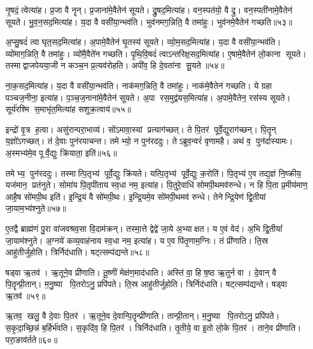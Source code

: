 नृ॒षदं॒ त्वेत्या॑ह।
प्र॒जा वै नॄन्।
प्र॒जाना॑मे॒वैतेन॑ सूयते।
द्रु॒षद॒मित्या॑ह।
वन॒स्पत॑यो॒ वै द्रु।
वन॒स्पती॑नामे॒वैतेन॑ सूयते।
भु॒व॒न॒सद॒मित्या॑ह।
य॒दा वै वसी॑या॒न्भव॑ति।
भुव॑नमग॒न्निति॒ वै तमा॑हुः।
भुव॑नमे॒वैतेन॑ गच्छति॥५३॥

अ॒प्सु॒षदं॑ त्वा घृत॒सद॒मित्या॑ह।
अ॒पामे॒वैतेन॑ घृ॒तस्य॑ सूयते।
व्यो॒म॒सद॒मित्या॑ह।
य॒दा वै वसी॑या॒न्भव॑ति।
व्यो॑माग॒न्निति॒ वै तमा॑हुः।
व्यो॑मै॒वैते॑न गच्छति।
पृ॒थि॒वि॒षदं॑ त्वाऽन्तरिक्ष॒सद॒मित्या॑ह।
ए॒षामे॒वैतेन॑ लो॒काना सूयते।
तस्माद्वाजपेयया॒जी न कञ्च॒न प्र॒त्यव॑रोहति।
अपी॑व॒ हि दे॒वता॑ना सू॒यते॥५४॥

ना॒क॒सद॒मित्या॑ह।
य॒दा वै वसी॑या॒न्भव॑ति।
नाक॑मग॒न्निति॒ वै तमा॑हुः।
नाक॑मे॒वैतेन॑ गच्छति।
ये ग्रहा पञ्चज॒नीना॒ इत्या॑ह।
प॒ञ्च॒ज॒नाना॑मे॒वैतेन॑ सूयते।
अ॒पा रस॒मुद्व॑यस॒मित्या॑ह।
अ॒पामे॒वैतेन॒ रस॑स्य सूयते।
सूर्य॑रश्मि स॒माभृ॑त॒मित्या॑ह सशुक्र॒त्वाय॑॥५५॥\anuvakamend[ग॒च्छ॒ति॒ सू॒यते॒ नव॑ च]

इन्द्रो॑ वृ॒त्र ह॒त्वा।
असु॑रान्परा॒भाव्य॑।
सो॑ऽमावा॒स्यां प्रत्याग॑च्छत्।
ते पि॒तर॑ पूर्वे॒द्युराग॑च्छन्।
पि॒तॄन् य॒ज्ञो॑ऽगच्छत्।
तं दे॒वाः पुन॑रयाचन्त।
तमेभ्यो॒ न पुन॑रददुः।
तेऽब्रुव॒न्वरं॑ वृणामहै।
अथ॑ व॒ पुन॑र्दास्यामः।
अ॒स्मभ्य॑मे॒व पूर्वे॒द्युः क्रि॑याता॒ इति॑॥५६॥

तमेभ्य॒ पुन॑रददुः।
तस्मात्पि॒तृभ्य॑ पूर्वे॒द्युः क्रि॑यते।
यत्पि॒तृभ्य॑ पूर्वे॒द्युः क॒रोति॑।
पि॒तृभ्य॑ ए॒व तद्य॒ज्ञं नि॒ष्क्रीय॒ यज॑मान॒ प्रत॑नुते।
सोमा॑य पि॒तृपी॑ताय स्व॒धा नम॒ इत्या॑ह।
पि॒तुरे॒वाधि॑ सोमपी॒थमव॑रुन्धे।
न हि पि॒ता प्र॒मीय॑माण॒ आहै॒ष सो॑मपी॒थ इति॑।
इ॒न्द्रि॒यं वै सो॑मपी॒थः।
इ॒न्द्रि॒यमे॒व सो॑मपी॒थमव॑ रुन्धे।
तेनेन्द्रि॒येण॑ द्वि॒तीयां जा॒याम॒भ्य॑श्नुते॥५७॥

ए॒तद्वै ब्राह्म॑णं पु॒रा वा॑जवश्रव॒सा वि॒दाम॑क्रन्।
तस्मा॒त्ते द्वेद्वे॑ जा॒ये अ॒भ्याक्षत।
य ए॒वं वेद॑।
अ॒भि द्वि॒तीयां॑ जा॒याम॑श्नुते।
अ॒ग्नये॑ कव्य॒वाह॑नाय स्व॒धा नम॒ इत्या॑ह।
य ए॒व पि॑तृ॒णाम॒ग्निः।
तं प्री॑णाति।
ति॒स्र आहु॑तीर्जुहोति।
त्रिर्निद॑धाति।
षट्त्सम्प॑द्यन्ते॥५८॥

षड्वा ऋ॒तव॑।
ऋ॒तूने॒व प्री॑णाति।
तू॒ष्णीं मेक्ष॑ण॒माद॑धाति।
अस्ति॑ वा॒ हि ष॒ष्ठ ऋ॒तुर्न वा।
दे॒वान् वै पि॒तॄन्प्री॒तान्।
म॒नु॒ष्या पि॒तरोऽनु॒ प्रपि॑पते।
ति॒स्र आहु॑तीर्जुहोति।
त्रिर्निद॑धाति।
षट्त्सम्प॑द्यन्ते।
षड्वा ऋ॒तव॑॥५९॥

ऋ॒तव॒ खलु॒ वै दे॒वाः पि॒तर॑।
ऋ॒तूने॒व दे॒वान्पि॒तॄन्प्री॑णाति।
तान्प्री॒तान्।
म॒नु॒ष्या पि॒तरोऽनु॒ प्रपि॑पते।
स॒कृ॒दा॒च्छि॒न्नं ब॒र्\mbox{}हिर्भ॑वति।
स॒कृदि॑व॒ हि पि॒तर॑।
त्रिर्निद॑धाति।
तृ॒तीये॒ वा इ॒तो लो॒के पि॒तर॑।
ताने॒व प्री॑णाति।
परा॒ङाव॑र्तते॥६०॥

